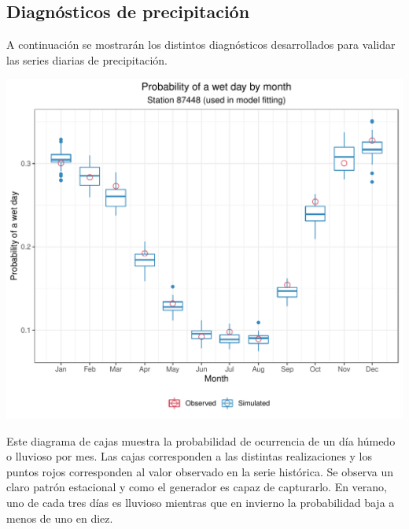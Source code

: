 \documentclass[
]{article}
\begin{document}
\hypertarget{diagnuxf3sticos-de-precipitaciuxf3n}{%
\subsection{Diagnósticos de precipitación}\label{diagnuxf3sticos-de-precipitaciuxf3n}}

A continuación se mostrarán los distintos diagnósticos desarrollados para validar las series diarias de precipitación.

\begin{center}\includegraphics{Webinario_Generador_files/figure-latex/unnamed-chunk-27-1} \end{center}

Este diagrama de cajas muestra la probabilidad de ocurrencia de un día húmedo o lluvioso por mes. Las cajas corresponden a las distintas realizaciones y los puntos rojos corresponden al valor observado en la serie histórica.
Se observa un claro patrón estacional y como el generador es capaz de capturarlo. En verano, uno de cada tres días es lluvioso mientras que en invierno la probabilidad baja a menos de uno en diez.
\end{document}
